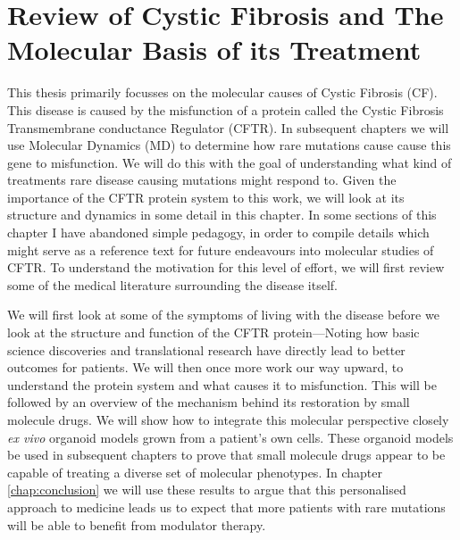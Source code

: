 \chapter{Review of Cystic Fibrosis and The Molecular Basis of its Treatment}
\label{chap:cftr}
\newpage





This thesis primarily focusses on the molecular causes of Cystic Fibrosis (CF). This disease is caused by the misfunction of a protein called the Cystic Fibrosis Transmembrane conductance Regulator (CFTR). In subsequent chapters we will use Molecular Dynamics (MD) to determine how rare mutations cause cause this gene to misfunction. We will do this with the goal of understanding what kind of treatments rare disease causing mutations might respond to. Given the importance of the CFTR protein system to this work, we will look at its structure and dynamics in some detail in this chapter. In some sections of this chapter I have abandoned simple pedagogy, in order to compile details which might serve as a reference text for future endeavours into molecular studies of CFTR. To understand the motivation for this level of effort, we will first review some of the medical literature surrounding the disease itself. 

We will first look at some of the symptoms of living with the disease before we look at the structure and function of the CFTR protein---Noting how basic science discoveries and translational research have directly lead to better outcomes for patients. We will then once more work our way upward, to understand the protein system and what causes it to misfunction. This will be followed by an overview of the mechanism behind its restoration by small molecule drugs. We will show how to integrate this molecular perspective closely \textit {ex vivo} organoid models grown from a patient's own cells. These organoid models be used in subsequent chapters to prove that small molecule drugs appear to be capable of treating a diverse set of molecular phenotypes. In chapter \ref{chap:conclusion} we will use these results to argue that this personalised approach to medicine leads us to expect that more patients with rare mutations will be able to benefit from modulator therapy. 

